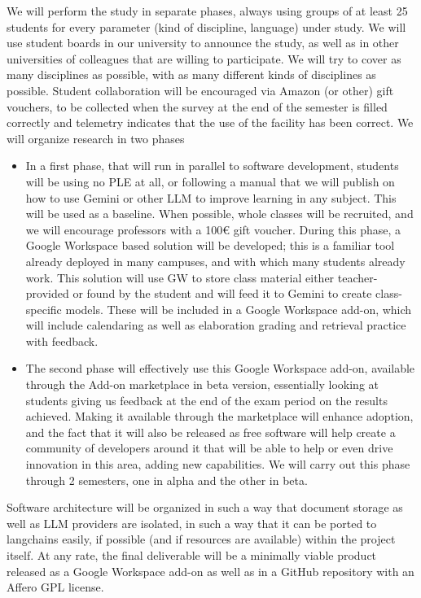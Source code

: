 \documentclass[a4paper,12pt]{article}
\begin{document}
We will perform the study in separate phases, always using groups of at least 25
students for every parameter (kind of discipline, language) under study. We will
use student boards in our university to announce the study, as well as in other
universities of colleagues that are willing to participate. We will try to cover
as many disciplines as possible, with as many different kinds of disciplines as
possible. Student collaboration will be encouraged via Amazon (or other) gift
vouchers, to be collected when the survey at the end of the semester is filled
correctly and telemetry indicates that the use of the facility has been
correct. We will organize research in two phases\begin{itemize}
  \item In a first phase, that will run in parallel to software development,
    students will be using no PLE at all, or following a manual that we will
    publish on how to use Gemini or other LLM to improve learning in any
    subject. This will be used as a baseline. When possible, whole classes will be
    recruited, and we will encourage professors with a 100€ gift voucher. During
    this phase, a Google Workspace based solution will be developed; this is a
    familiar tool already deployed in many campuses, and with which many
    students already work. This solution will use GW to store class material
    either teacher-provided or found by the student and will feed it to Gemini
    to create class-specific models. These will be included in a Google
    Workspace add-on, which will include calendaring as well as elaboration
    grading and retrieval practice with feedback.
  \item The second phase will effectively use this Google Workspace add-on,
    available through the Add-on marketplace in beta version, essentially
    looking at students giving us feedback at the end of the exam period on the
    results achieved. Making it available through the marketplace will enhance
    adoption, and the fact that it will also be released as free software will
    help create a community of developers around it that will be able to help or
    even drive innovation in this area, adding new capabilities. We will carry
    out this phase through 2 semesters, one in alpha and the other in beta.
  \end{itemize}

Software architecture will be organized in such a way that document storage as well as
LLM providers are isolated, in such a way that it can be ported to langchains
easily, if possible (and if resources are available) within the project
itself. At any rate, the final deliverable will be a minimally viable product
released as a Google Workspace add-on as well as in a GitHub repository with an
Affero GPL license.
\end{document}
